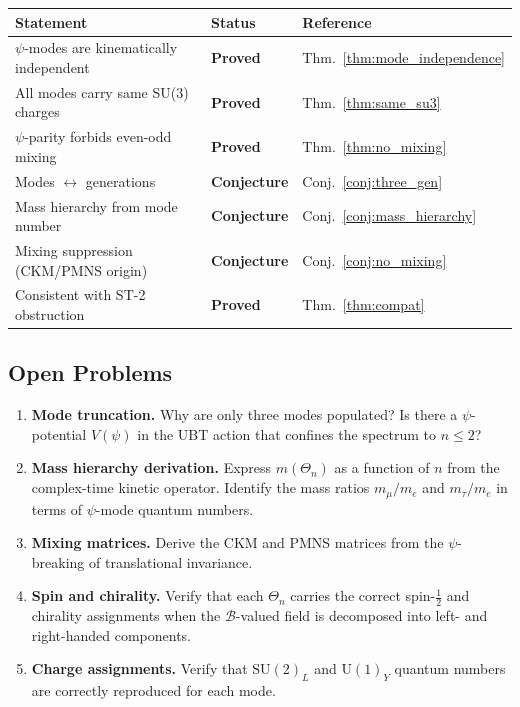 \documentclass[12pt,a4paper]{article}
\theoremstyle{remark}
\begin{document}
\begin{center}
\begin{tabular}{lll}
  \hline
  Statement & Status & Reference \\
  \hline
  $\psi$-modes are kinematically independent & \textbf{Proved} & Thm.~\ref{thm:mode_independence} \\
  All modes carry same SU(3) charges & \textbf{Proved} & Thm.~\ref{thm:same_su3} \\
  $\psi$-parity forbids even-odd mixing & \textbf{Proved} & Thm.~\ref{thm:no_mixing} \\
  Modes $\leftrightarrow$ generations & \textbf{Conjecture} & Conj.~\ref{conj:three_gen} \\
  Mass hierarchy from mode number & \textbf{Conjecture} & Conj.~\ref{conj:mass_hierarchy} \\
  Mixing suppression (CKM/PMNS origin) & \textbf{Conjecture} & Conj.~\ref{conj:no_mixing} \\
  Consistent with ST-2 obstruction & \textbf{Proved} & Thm.~\ref{thm:compat} \\
  \hline
\end{tabular}
\end{center}

\subsection{Open Problems}

\begin{enumerate}
  \item \textbf{Mode truncation.}  Why are only three modes populated?
    Is there a $\psi$-potential $V(\psi)$ in the UBT action that confines
    the spectrum to $n \leq 2$?

  \item \textbf{Mass hierarchy derivation.}  Express $m(\Theta_n)$ as a
    function of $n$ from the complex-time kinetic operator.  Identify the
    mass ratios $m_\mu/m_e$ and $m_\tau/m_e$ in terms of $\psi$-mode quantum
    numbers.

  \item \textbf{Mixing matrices.}  Derive the CKM and PMNS matrices from
    the $\psi$-breaking of translational invariance.

  \item \textbf{Spin and chirality.}  Verify that each $\Theta_n$ carries
    the correct spin-$\frac{1}{2}$ and chirality assignments when the
    $\mathcal{B}$-valued field is decomposed into left- and right-handed
    components.

  \item \textbf{Charge assignments.}  Verify that $\mathrm{SU}(2)_L$ and
    $\mathrm{U}(1)_Y$ quantum numbers are correctly reproduced for each mode.
\end{enumerate}
\end{document}
